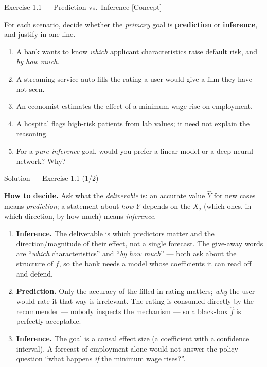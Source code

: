 \documentclass[aspectratio=169,11pt]{beamer}
\begin{document}
\begin{frame}{Exercise 1.1 --- Prediction vs.\ Inference [Concept]}
\begin{exercise}
For each scenario, decide whether the \emph{primary} goal is
\textbf{prediction} or \textbf{inference}, and justify in one line.
\begin{enumerate}
  \item A bank wants to know \emph{which} applicant characteristics
        raise default risk, and \emph{by how much}.
  \item A streaming service auto-fills the rating a user would give a
        film they have not seen.
  \item An economist estimates the effect of a minimum-wage rise on
        employment.
  \item A hospital flags high-risk patients from lab values; it need
        not explain the reasoning.
  \item For a \emph{pure inference} goal, would you prefer a linear
        model or a deep neural network? Why?
\end{enumerate}
\end{exercise}
\end{frame}

\begin{frame}{Solution --- Exercise 1.1 (1/2)}
\begin{solutionbox}
\textbf{How to decide.} Ask what the \emph{deliverable} is: an accurate
value $\hat Y$ for new cases means \emph{prediction}; a statement about
\emph{how} $Y$ depends on the $X_j$ (which ones, in which direction, by
how much) means \emph{inference}.
\begin{enumerate}
  \item \textbf{Inference.} The deliverable is which predictors matter
        and the direction/magnitude of their effect, not a single
        forecast. The give-away words are ``\emph{which}
        characteristics'' and ``\emph{by how much}'' --- both ask about
        the structure of $f$, so the bank needs a model whose
        coefficients it can read off and defend.
  \item \textbf{Prediction.} Only the accuracy of the filled-in rating
        matters; \emph{why} the user would rate it that way is
        irrelevant. The rating is consumed directly by the recommender
        --- nobody inspects the mechanism --- so a black-box $\hat f$
        is perfectly acceptable.
  \item \textbf{Inference.} The goal is a causal effect size (a
        coefficient with a confidence interval). A forecast of
        employment alone would not answer the policy question ``what
        happens \emph{if} the minimum wage rises?''.
\end{enumerate}
\end{solutionbox}
\end{frame}
\end{document}
